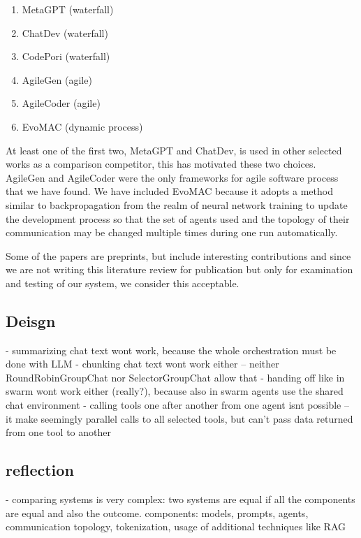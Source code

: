 \begin{enumerate}
	\item MetaGPT \cite{hong2024metagptmetaprogrammingmultiagent}  (waterfall)
	\item ChatDev \cite{qian2024chatdevcommunicativeagentssoftware} (waterfall)
	\item CodePori \cite{rasheed2024codeporilargescaleautonomoussoftware} (waterfall) 
	\item AgileGen \cite{zhang2024empoweringagilebasedgenerativesoftware} (agile)
	\item AgileCoder \cite{nguyen2024agilecoderdynamiccollaborativeagents} (agile)
	\item EvoMAC \cite{hu2024selfevolvingmultiagentcollaborationnetworks} (dynamic process)
\end{enumerate}

At least one of the first two, MetaGPT and ChatDev, is used in other selected works as a comparison competitor, this has motivated these two choices. AgileGen and AgileCoder were the only frameworks for agile software process that we have found. We have included EvoMAC because it adopts a method similar to backpropagation from the realm of neural network training to update the development process so that the set of agents used and the topology of their communication may be changed multiple times during one run automatically.


Some of the papers are preprints, but include interesting contributions and since we are not writing this literature review for publication but only for examination and testing of our system, we consider this acceptable.



\subsection{Deisgn}

- summarizing chat text wont work, because the whole orchestration must be done with LLM
- chunking chat text wont work either -- neither RoundRobinGroupChat nor SelectorGroupChat allow that
- handing off like in swarm wont work either (really?), because also in swarm agents use the shared chat environment
- calling tools one after another from one agent isnt possible -- it make seemingly parallel calls to all selected tools, but can't pass data returned from one tool to another 

\subsection{reflection}

- comparing systems is very complex: two systems are equal if all the components are equal and also the outcome. components: models, prompts, agents, communication topology, tokenization, usage of additional techniques like RAG
